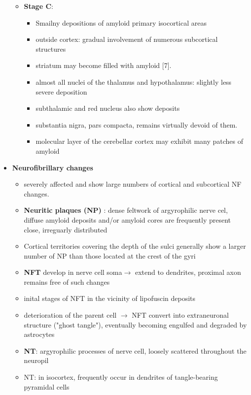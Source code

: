 \documentclass[fleqn]{article}\usepackage{caption}
\begin{document}
\begin{itemize}
\begin{itemize}
\item \textbf{Stage C}: 
\begin{itemize}\item Smailny depositions of amyloid primary isocortical areas 
\item outside cortex:  gradual involvement of numerous subcortical structures
\item striatum may become filled with amyloid [7].
\item almost all nuclei of the thalamus and hypothalamus: slightly less severe deposition
\item subthalamic and red nucleus  also show deposits
\item substantia nigra, pars compacta, remains virtually devoid of them. 
\item molecular layer of the cerebellar cortex may exhibit many patches of amyloid
\end{itemize}
\end{itemize}

\item \textbf{Neurofibrillary changes}
\begin{itemize}
\item severely affected and show large numbers of cortical
and subcortical NF changes.
\item \textbf{Neuritic plaques (NP)} : dense feltwork of argyrophilic nerve cel,  diffuse amyloid deposits and/or
amyloid cores are frequently present close, irreguarly distributed
\item  Cortical territories covering the depth of the sulci generally show a larger number of NP
than those located at the crest of the gyri

\item \textbf{NFT} develop in nerve cell soma$\rightarrow$ extend to dendrites, proximal axon remains free of such changes
\item inital stages of NFT in the vicinity of lipofuscin deposits
\item  deterioration of the parent cell $\rightarrow$ NFT convert into extraneuronal structure ("ghost tangle"), eventually
becoming engulfed and degraded by astrocytes


\item \textbf{NT}: argyrophilic processes of nerve cell, loosely scattered throughout the neuropil
\item NT: in isocortex,  frequently occur in dendrites of tangle-bearing pyramidal cells


\end{itemize}
\end{itemize}
\end{document}

